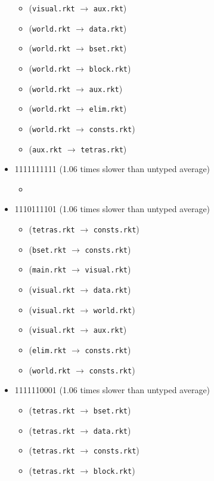 \documentclass{article}
\newcommand{\mono}[1]{\texttt{#1}}
\begin{document}
\begin{itemize}
\begin{itemize}
  \item (\mono{visual.rkt} $\rightarrow$ \mono{aux.rkt})
  \item (\mono{world.rkt} $\rightarrow$ \mono{data.rkt})
  \item (\mono{world.rkt} $\rightarrow$ \mono{bset.rkt})
  \item (\mono{world.rkt} $\rightarrow$ \mono{block.rkt})
  \item (\mono{world.rkt} $\rightarrow$ \mono{aux.rkt})
  \item (\mono{world.rkt} $\rightarrow$ \mono{elim.rkt})
  \item (\mono{world.rkt} $\rightarrow$ \mono{consts.rkt})
  \item (\mono{aux.rkt} $\rightarrow$ \mono{tetras.rkt})
  \end{itemize}
\item 1111111111 (1.06 times slower than untyped average)
  \begin{itemize}
  \item 
  \end{itemize}
\item 1110111101 (1.06 times slower than untyped average)
  \begin{itemize}
  \item (\mono{tetras.rkt} $\rightarrow$ \mono{consts.rkt})
  \item (\mono{bset.rkt} $\rightarrow$ \mono{consts.rkt})
  \item (\mono{main.rkt} $\rightarrow$ \mono{visual.rkt})
  \item (\mono{visual.rkt} $\rightarrow$ \mono{data.rkt})
  \item (\mono{visual.rkt} $\rightarrow$ \mono{world.rkt})
  \item (\mono{visual.rkt} $\rightarrow$ \mono{aux.rkt})
  \item (\mono{elim.rkt} $\rightarrow$ \mono{consts.rkt})
  \item (\mono{world.rkt} $\rightarrow$ \mono{consts.rkt})
  \end{itemize}
\item 1111110001 (1.06 times slower than untyped average)
  \begin{itemize}
  \item (\mono{tetras.rkt} $\rightarrow$ \mono{bset.rkt})
  \item (\mono{tetras.rkt} $\rightarrow$ \mono{data.rkt})
  \item (\mono{tetras.rkt} $\rightarrow$ \mono{consts.rkt})
  \item (\mono{tetras.rkt} $\rightarrow$ \mono{block.rkt})

\end{itemize}
\end{itemize}
\end{document}
